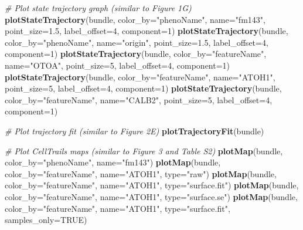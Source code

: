 \documentclass[]{book}
\newenvironment{Shaded}{\begin{snugshade}}{\end{snugshade}}
\newcommand{\KeywordTok}[1]{\textcolor[rgb]{0.13,0.29,0.53}{\textbf{#1}}}
\newcommand{\DataTypeTok}[1]{\textcolor[rgb]{0.13,0.29,0.53}{#1}}
\newcommand{\DecValTok}[1]{\textcolor[rgb]{0.00,0.00,0.81}{#1}}
\newcommand{\FloatTok}[1]{\textcolor[rgb]{0.00,0.00,0.81}{#1}}
\newcommand{\StringTok}[1]{\textcolor[rgb]{0.31,0.60,0.02}{#1}}
\newcommand{\CommentTok}[1]{\textcolor[rgb]{0.56,0.35,0.01}{\textit{#1}}}
\newcommand{\OtherTok}[1]{\textcolor[rgb]{0.56,0.35,0.01}{#1}}
\newcommand{\NormalTok}[1]{#1}
\theoremstyle{definition}
\theoremstyle{definition}
\theoremstyle{definition}
\theoremstyle{remark}
\begin{document}
\begin{Shaded}
\begin{Highlighting}[]
\CommentTok{# Plot state trajectory graph (similar to Figure 1G)}
\KeywordTok{plotStateTrajectory}\NormalTok{(bundle, }\DataTypeTok{color_by=}\StringTok{"phenoName"}\NormalTok{, }
                    \DataTypeTok{name=}\StringTok{"fm143"}\NormalTok{, }\DataTypeTok{point_size=}\FloatTok{1.5}\NormalTok{, }
                    \DataTypeTok{label_offset=}\DecValTok{4}\NormalTok{, }\DataTypeTok{component=}\DecValTok{1}\NormalTok{)}
\KeywordTok{plotStateTrajectory}\NormalTok{(bundle, }\DataTypeTok{color_by=}\StringTok{"phenoName"}\NormalTok{, }
                    \DataTypeTok{name=}\StringTok{"origin"}\NormalTok{, }\DataTypeTok{point_size=}\FloatTok{1.5}\NormalTok{, }
                    \DataTypeTok{label_offset=}\DecValTok{4}\NormalTok{, }\DataTypeTok{component=}\DecValTok{1}\NormalTok{)}
\KeywordTok{plotStateTrajectory}\NormalTok{(bundle, }\DataTypeTok{color_by=}\StringTok{"featureName"}\NormalTok{, }
                    \DataTypeTok{name=}\StringTok{"OTOA"}\NormalTok{, }\DataTypeTok{point_size=}\DecValTok{5}\NormalTok{, }
                    \DataTypeTok{label_offset=}\DecValTok{4}\NormalTok{, }\DataTypeTok{component=}\DecValTok{1}\NormalTok{)}
\KeywordTok{plotStateTrajectory}\NormalTok{(bundle, }\DataTypeTok{color_by=}\StringTok{"featureName"}\NormalTok{, }
                    \DataTypeTok{name=}\StringTok{"ATOH1"}\NormalTok{, }\DataTypeTok{point_size=}\DecValTok{5}\NormalTok{, }
                    \DataTypeTok{label_offset=}\DecValTok{4}\NormalTok{, }\DataTypeTok{component=}\DecValTok{1}\NormalTok{)}
\KeywordTok{plotStateTrajectory}\NormalTok{(bundle, }\DataTypeTok{color_by=}\StringTok{"featureName"}\NormalTok{, }
                    \DataTypeTok{name=}\StringTok{"CALB2"}\NormalTok{, }\DataTypeTok{point_size=}\DecValTok{5}\NormalTok{, }
                    \DataTypeTok{label_offset=}\DecValTok{4}\NormalTok{, }\DataTypeTok{component=}\DecValTok{1}\NormalTok{)}

\CommentTok{# Plot trajectory fit (similar to Figure 2E)}
\KeywordTok{plotTrajectoryFit}\NormalTok{(bundle)}

\CommentTok{# Plot CellTrails maps (similar to Figure 3 and Table S2)}
\KeywordTok{plotMap}\NormalTok{(bundle, }\DataTypeTok{color_by=}\StringTok{"phenoName"}\NormalTok{, }\DataTypeTok{name=}\StringTok{"fm143"}\NormalTok{)}
\KeywordTok{plotMap}\NormalTok{(bundle, }\DataTypeTok{color_by=}\StringTok{"featureName"}\NormalTok{, }
        \DataTypeTok{name=}\StringTok{"ATOH1"}\NormalTok{, }\DataTypeTok{type=}\StringTok{"raw"}\NormalTok{)}
\KeywordTok{plotMap}\NormalTok{(bundle, }\DataTypeTok{color_by=}\StringTok{"featureName"}\NormalTok{, }
        \DataTypeTok{name=}\StringTok{"ATOH1"}\NormalTok{, }\DataTypeTok{type=}\StringTok{"surface.fit"}\NormalTok{)}
\KeywordTok{plotMap}\NormalTok{(bundle, }\DataTypeTok{color_by=}\StringTok{"featureName"}\NormalTok{, }
        \DataTypeTok{name=}\StringTok{"ATOH1"}\NormalTok{, }\DataTypeTok{type=}\StringTok{"surface.se"}\NormalTok{)}
\KeywordTok{plotMap}\NormalTok{(bundle, }\DataTypeTok{color_by=}\StringTok{"featureName"}\NormalTok{, }
        \DataTypeTok{name=}\StringTok{"ATOH1"}\NormalTok{, }\DataTypeTok{type=}\StringTok{"surface.fit"}\NormalTok{, }\DataTypeTok{samples_only=}\OtherTok{TRUE}\NormalTok{)}


\end{Highlighting}
\end{Shaded}
\end{document}
